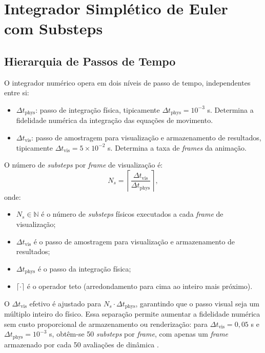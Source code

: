 \section{Integrador Simplético de Euler com Substeps}
\label{sec:integrador}

\subsection{Hierarquia de Passos de Tempo}

O integrador numérico opera em dois níveis de passo de tempo, independentes entre si:

\begin{itemize}
    \item $\Delta t_{\text{phys}}$: passo de integração física, tipicamente $\Delta t_{\text{phys}} = 10^{-3}$ s. Determina a fidelidade numérica da integração das equações de movimento.
    \item $\Delta t_{\text{vis}}$: passo de amostragem para visualização e armazenamento de resultados, tipicamente $\Delta t_{\text{vis}} = 5 \times 10^{-2}$ s. Determina a taxa de \textit{frames} da animação.
\end{itemize}

O número de \textit{substeps} por \textit{frame} de visualização é:
\begin{equation}
    N_s = \left\lceil \frac{\Delta t_{\text{vis}}}{\Delta t_{\text{phys}}} \right\rceil,
    \label{eq:substeps}
\end{equation}
onde:
\begin{itemize}
    \item $N_s \in \mathbb{N}$ é o número de \textit{substeps} físicos executados a cada \textit{frame} de visualização;
    \item $\Delta t_{\text{vis}}$ é o passo de amostragem para visualização e armazenamento de resultados;
    \item $\Delta t_{\text{phys}}$ é o passo da integração física;
    \item $\lceil \cdot \rceil$ é o operador teto (arredondamento para cima ao inteiro mais próximo).
\end{itemize}
O $\Delta t_{\text{vis}}$ efetivo é ajustado para $N_s \cdot \Delta t_{\text{phys}}$, garantindo que o passo visual seja um múltiplo inteiro do físico. Essa separação permite aumentar a fidelidade numérica sem custo proporcional de armazenamento ou renderização: para $\Delta t_{\text{vis}} = 0,05$ s e $\Delta t_{\text{phys}} = 10^{-3}$ s, obtêm-se 50 \textit{substeps} por \textit{frame}, com apenas um \textit{frame} armazenado por cada 50 avaliações de dinâmica \cite{leimkuhler2004simulating}.

